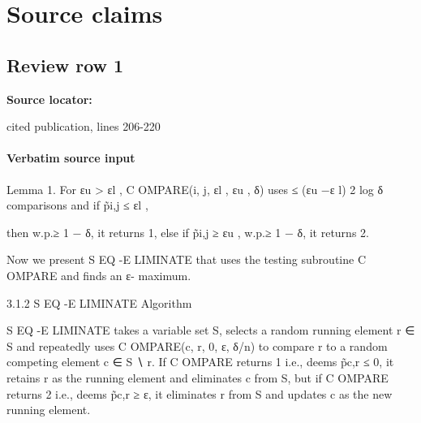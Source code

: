 \documentclass[10pt]{article}
\begin{document}
\section*{Source claims}
\subsection*{Review row 1}
\textbf{Source locator:} {\footnotesize\raggedright cited publication, lines 206-\allowbreak{}220\par}
\paragraph{Verbatim source input}
\begin{ReviewVerbatim}
Lemma 1. For εu > εl , C OMPARE(i, j, εl , εu , δ) uses ≤ (εu −ε       l)
                                                                         2 log δ comparisons and if p̃i,j ≤ εl ,

then w.p.≥ 1 − δ, it returns 1, else if p̃i,j ≥ εu , w.p.≥ 1 − δ, it returns 2.

Now we present S EQ -E LIMINATE that uses the testing subroutine C OMPARE and finds an ε-
maximum.

3.1.2   S EQ -E LIMINATE Algorithm

S EQ -E LIMINATE takes a variable set S, selects a random running element r ∈ S and repeatedly
uses C OMPARE(c, r, 0, ε, δ/n) to compare r to a random competing element c ∈ S ∖ r. If C OMPARE
returns 1 i.e., deems p̃c,r ≤ 0, it retains r as the running element and eliminates c from S, but if
C OMPARE returns 2 i.e., deems p̃c,r ≥ ε, it eliminates r from S and updates c as the new running
element.
\end{ReviewVerbatim}
\end{document}
